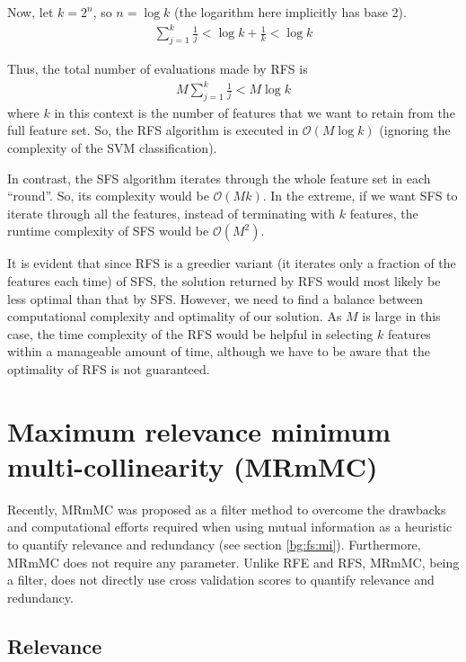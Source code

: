 \documentclass[12pt, twoside, a4paper]{report}
\begin{document}
Now, let $k=2^n$, so $n=\log k$ (the logarithm here implicitly has base 2).
\begin{align*}
\sum_{j=1}^k \frac{1}{j} < \log k+ \frac{1}{k} < \log k
\end{align*}

Thus, the total number of evaluations made by RFS is
\begin{align*}
M \sum_{j=1}^k \frac{1}{j} < M \log k
\end{align*}
where $k$ in this context is the number of features that we want to retain from the full feature set. So, the RFS algorithm is executed in $\mathcal{O}(M\log k)$ (ignoring the complexity of the SVM classification).

In contrast, the SFS algorithm iterates through the whole feature set in each ``round''. So, its complexity would be $\mathcal{O}(Mk)$. In the extreme, if we want SFS to iterate through all the features, instead of terminating with $k$ features, the runtime complexity of SFS would be $\mathcal{O}(M^2)$.

It is evident that since RFS is a greedier variant (it iterates only a fraction of the features each time) of SFS, the solution returned by RFS would most likely be less optimal than that by SFS. However, we need to find a balance between computational complexity and optimality of our solution. As $M$ is large in this case, the time complexity of the RFS would be helpful in selecting $k$ features within a manageable amount of time, although we have to be aware that the optimality of RFS is not guaranteed.


\section{Maximum relevance minimum multi-collinearity (MRmMC)} \label{mrmmc}

Recently, MRmMC \cite{RefWorks:187} was proposed as a filter method to overcome the drawbacks and computational efforts required when using mutual information as a heuristic to quantify relevance and redundancy (see section \ref{bg:fs:mi}). Furthermore, MRmMC does not require any parameter. Unlike RFE and RFS, MRmMC, being a filter, does not directly use cross validation scores to quantify relevance and redundancy. 


\subsection{Relevance}
\end{document}
